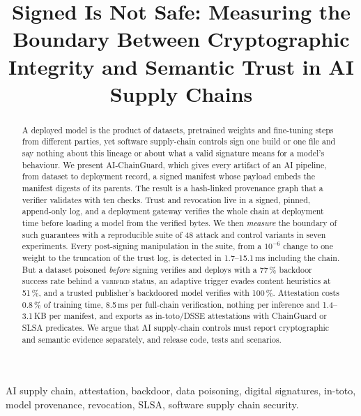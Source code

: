 \documentclass[conference]{IEEEtran}
\newcommand{\sys}{AI-ChainGuard}
\newcommand{\st}[1]{\textsc{#1}}
\begin{document}
\title{Signed Is Not Safe: Measuring the Boundary Between Cryptographic Integrity and Semantic Trust in AI Supply Chains}

\author{
}

\maketitle

\begin{abstract}
A deployed model is the product of datasets, pretrained weights and fine-tuning steps from different parties, yet software supply-chain controls sign one build or one file and say nothing about this lineage or about what a valid signature means for a model's behaviour. We present \sys, which gives every artifact of an AI pipeline, from dataset to deployment record, a signed manifest whose payload embeds the manifest digests of its parents. The result is a hash-linked provenance graph that a verifier validates with ten checks. Trust and revocation live in a signed, pinned, append-only log, and a deployment gateway verifies the whole chain at deployment time before loading a model from the verified bytes. We then \emph{measure} the boundary of such guarantees with a reproducible suite of 48 attack and control variants in seven experiments. Every post-signing manipulation in the suite, from a $10^{-6}$ change to one weight to the truncation of the trust log, is detected in 1.7--15.1\,ms including the chain. But a dataset poisoned \emph{before} signing verifies and deploys with a 77\,\% backdoor success rate behind a \st{verified} status, an adaptive trigger evades content heuristics at 51\,\%, and a trusted publisher's backdoored model verifies with 100\,\%. Attestation costs 0.8\,\% of training time, 8.5\,ms per full-chain verification, nothing per inference and 1.4--3.1\,KB per manifest, and exports as in-toto/DSSE attestations with ChainGuard or SLSA predicates. We argue that AI supply-chain controls must report cryptographic and semantic evidence separately, and release code, tests and scenarios.
\end{abstract}

\begin{IEEEkeywords}
AI supply chain, attestation, backdoor, data poisoning, digital signatures, in-toto, model provenance, revocation, SLSA, software supply chain security.
\end{IEEEkeywords}
\end{document}
